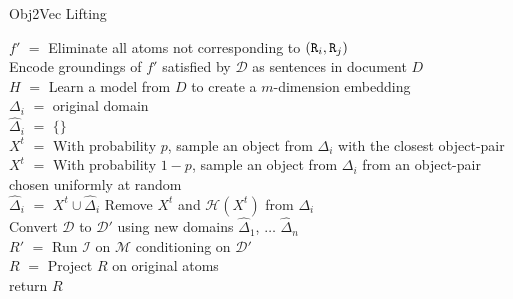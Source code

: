 \begin{algorithm}[!t]{
\label{alg:wvec}
\linesnumbered
\caption{Obj2Vec Lifting}
{
 {
$f'$ $=$ Eliminate all atoms not corresponding to $({\tt R}_i,{\tt R}_j)$\\
Encode groundings of $f'$ satisfied by $\mathcal{D}$ as sentences in document $D$\\
}
}
$H$ $=$ Learn a model from $D$ to create a $m$-dimension embedding\\
 {
$\Delta_i$ $=$ original domain\\
$\hat{\Delta}_i$ $=$ $\{\}$\\
 {
$X^t$ $=$ With probability $p$, sample an object from $\Delta_i$ with the closest object-pair\\
$X^t$ $=$ With probability $1-p$, sample an object from $\Delta_i$ from an object-pair chosen uniformly at random\\
$\hat{\Delta}_i$ $=$ $X^t\cup \hat{\Delta}_i$
Remove $X^t$ and $\mathcal{H}(X^t)$ from $\Delta_i$\\
}
}
Convert $\mathcal{D}$ to $\mathcal{D}'$ using new domains $\hat{\Delta}_1$, $\ldots$ $\hat{\Delta}_n$\\
$R'$ $=$ Run $\mathcal{I}$ on $\mathcal{M}$ conditioning on $\mathcal{D}'$\\
$R$ $=$ Project $R$ on original atoms\\
return $R$\\
}
\end{algorithm}




